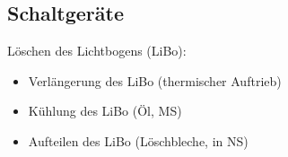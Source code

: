 

\subsection{Schaltgeräte}
Löschen des Lichtbogens (LiBo):
\begin{itemize}
\item Verlängerung des LiBo (thermischer Auftrieb)
\item Kühlung des LiBo (Öl, MS)
\item Aufteilen des LiBo (Löschbleche, in NS)
\end{itemize}
